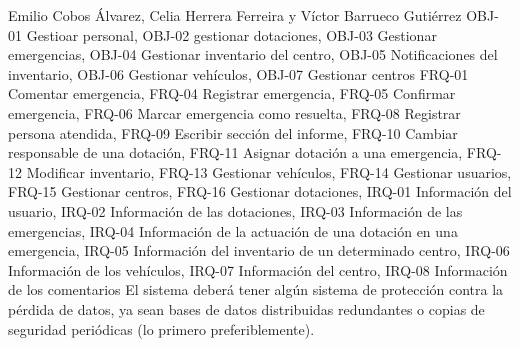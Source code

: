 {Emilio Cobos Álvarez, Celia Herrera Ferreira y Víctor Barrueco Gutiérrez}
{}
{OBJ-01 Gestioar personal, OBJ-02 gestionar dotaciones, OBJ-03 Gestionar emergencias, OBJ-04 Gestionar inventario del centro, OBJ-05 Notificaciones del inventario, OBJ-06 Gestionar vehículos, OBJ-07 Gestionar centros}
{FRQ-01 Comentar emergencia, FRQ-04 Registrar emergencia, FRQ-05 Confirmar emergencia, FRQ-06 Marcar emergencia como resuelta, FRQ-08 Registrar persona atendida, FRQ-09 Escribir sección del informe, FRQ-10 Cambiar responsable de una dotación, FRQ-11 Asignar dotación a una emergencia, FRQ-12 Modificar inventario, FRQ-13 Gestionar vehículos, FRQ-14 Gestionar usuarios, FRQ-15 Gestionar centros, FRQ-16 Gestionar dotaciones, IRQ-01 Información del usuario, IRQ-02 Información de las dotaciones, IRQ-03 Información de las emergencias, IRQ-04 Información de la actuación de una dotación en una emergencia, IRQ-05 Información del inventario de un determinado centro, IRQ-06 Información de los vehículos, IRQ-07 Información del centro, IRQ-08 Información de los comentarios}
{El sistema deberá tener algún sistema de protección contra la pérdida de datos, ya sean bases de datos distribuidas redundantes o copias de seguridad periódicas (lo primero preferiblemente).}

